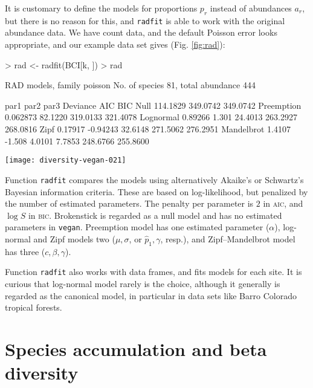 \documentclass[a4paper,10pt]{amsart}
\begin{document}
It is customary to define the models for proportions $p_r$ instead of
abundances $a_r$, but there is no reason for this, and \texttt{radfit}
is able to work with the original abundance data.  We have count data,
and the default Poisson error looks appropriate, and our example data
set gives (Fig. \ref{fig:rad}):
\begin{Schunk}
\begin{Sinput}
> rad <- radfit(BCI[k, ])
> rad
\end{Sinput}
\begin{Soutput}
RAD models, family poisson 
No. of species 81, total abundance 444

           par1      par2     par3    Deviance AIC      BIC     
Null                                  114.1829 349.0742 349.0742
Preemption  0.062873                   82.1220 319.0133 321.4078
Lognormal   0.89266   1.301            24.4013 263.2927 268.0816
Zipf        0.17917  -0.94243          32.6148 271.5062 276.2951
Mandelbrot  1.4107   -1.508    4.0101   7.7853 248.6766 255.8600
\end{Soutput}
\end{Schunk}
\begin{SCfigure}
\texttt{[image: diversity-vegan-021]}
\caption{Ranked abundance distribution models for a random plot
  (no. 45).  The best model is chosen by the \textsc{aic}, and
  displayed with a thick line.}
\label{fig:rad}
\end{SCfigure}

Function \texttt{radfit} compares the models using alternatively
Akaike's or Schwartz's Bayesian information criteria.  These are based
on log-likelihood, but penalized by the number of estimated
parameters.  The penalty per parameter is $2$ in \textsc{aic}, and
$\log S$ in \textsc{bic}.  Brokenstick is regarded as a null model and
has no estimated parameters in \texttt{vegan}.  Preemption model has
one estimated parameter ($\alpha$), log-normal and Zipf models two
($\mu, \sigma$, or $\hat p_1, \gamma$, resp.), and Zipf--Mandelbrot
model has three ($c, \beta, \gamma$).

Function \texttt{radfit} also works with data frames, and fits models
for each site. It is curious that log-normal model rarely is the
choice, although it generally is regarded as the canonical model, in
particular in data sets like Barro Colorado tropical forests.

\section{Species accumulation and beta diversity}
\end{document}
